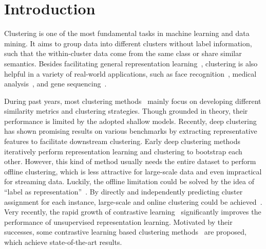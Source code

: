 \section{Introduction}\label{sec:introduction}

Clustering is one of the most fundamental tasks in machine learning and data mining. It aims to group data into different clusters without label information, such that the within-cluster data come from the same class or share similar semantics. Besides facilitating general representation learning~\citep{DeepClustering, SWAV}, clustering is also helpful in a variety of real-world applications, such as face recognition~\citep{FaceCluster}, medical analysis~\citep{Medical}, and gene sequencing~\citep{RNA}.

During past years, most clustering methods~\citep{chen2009spectral, nie2011spectral, GDL, liu2016multiple, liu2017sparse, nie2019k, tang2019kernel} mainly focus on developing different similarity metrics and clustering strategies. Though grounded in theory, their performance is limited by the adopted shallow models. Recently, deep clustering~\citep{ghasedi2017deep, deepclustering_wangqi} has shown promising results on various benchmarks by extracting representative features to facilitate downstream clustering. Early deep clustering methods~\citep{peng2016deep, JULE, DeepClustering, DEC} iteratively perform representation learning and clustering to bootstrap each other. However, this kind of method usually needs the entire dataset to perform offline clustering, which is less attractive for large-scale data and even impractical for streaming data. Luckily, the offline limitation could be solved by the idea of ``label as representation''~\citep{Peng2017:Cascade_full, LabelAsRep}. By directly and independently predicting cluster assignment for each instance, large-scale and online clustering could be achieved~\citep{IMSAT, IIC, PICA}. Very recently, the rapid growth of contrastive learning~\citep{SimCLR, BarlowTwins} significantly improves the performance of unsupervised representation learning. Motivated by their successes, some contrastive learning based clustering methods~\citep{SCAN, CC, SPICE, han2020mitigating} are proposed, which achieve state-of-the-art results.

